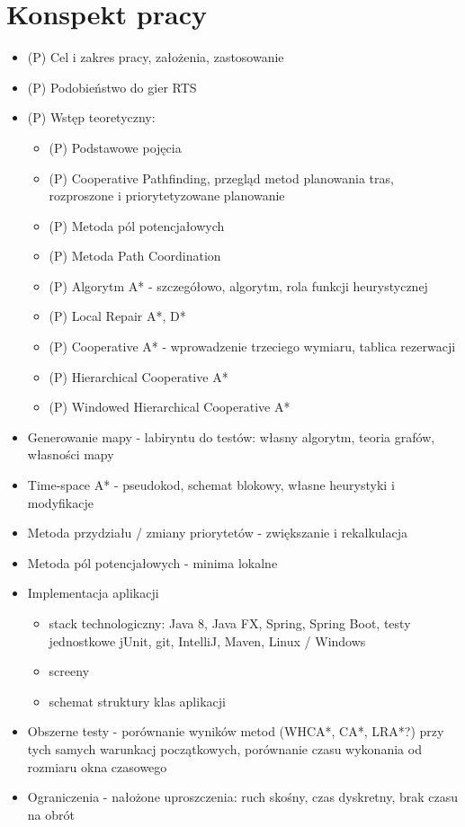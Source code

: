 \section{Konspekt pracy}
\label{ch:konspekt}
\begin{itemize}
	\item (P) Cel i zakres pracy, założenia, zastosowanie
	\item (P) Podobieństwo do gier RTS
	\item (P) Wstęp teoretyczny:
	\begin{itemize}
		\item (P) Podstawowe pojęcia
		\item (P) Cooperative Pathfinding, przegląd metod planowania tras, rozproszone i priorytetyzowane planowanie
		\item (P) Metoda pól potencjałowych
		\item (P) Metoda Path Coordination
		\item (P) Algorytm A* - szczegółowo, algorytm, rola funkcji heurystycznej
		\item (P) Local Repair A*, D*
		\item (P) Cooperative A* - wprowadzenie trzeciego wymiaru, tablica rezerwacji
		\item (P) Hierarchical Cooperative A*
		\item (P) Windowed Hierarchical Cooperative A*
	\end{itemize}
	\item Generowanie mapy - labiryntu do testów: własny algorytm, teoria grafów, własności mapy
	\item Time-space A* - pseudokod, schemat blokowy, własne heurystyki i modyfikacje
	\item Metoda przydziału / zmiany priorytetów - zwiększanie i rekalkulacja
	\item Metoda pól potencjałowych - minima lokalne
	\item Implementacja aplikacji
	\begin{itemize}
		\item stack technologiczny: Java 8, Java FX, Spring, Spring Boot, testy jednostkowe jUnit, git, IntelliJ, Maven, Linux / Windows
		\item screeny
		\item schemat struktury klas aplikacji
	\end{itemize}
	\item Obszerne testy - porównanie wyników metod (WHCA*, CA*, LRA*?) przy tych samych warunkacj początkowych, porównanie czasu wykonania od rozmiaru okna czasowego
	\item Ograniczenia - nałożone uproszczenia: ruch skośny, czas dyskretny, brak czasu na obrót
\end{itemize}